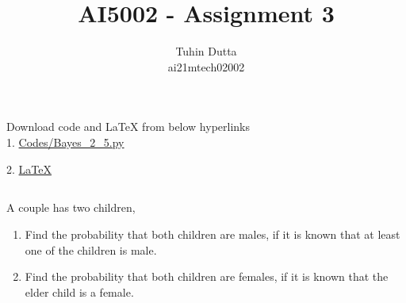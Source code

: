 \documentclass[journal,12pt,twocolumn]{IEEEtran}
\begin{document}
\providecommand{\mtx}[1]{\mathbf{#1}}
\providecommand{\fourier}{\overset{\mathcal{F}}{ \rightleftharpoons}}
\providecommand{\system}{\overset{\mathcal{H}}{ \longleftrightarrow}}
\newcommand{\solution}{\noindent \textbf{Solution: }}
\newcommand{\cosec}{\,\text{cosec}\,}
\providecommand{\dec}[2]{\ensuremath{\overset{#1}{\underset{#2}{\gtrless}}}}
\newcommand{\myvec}[1]{\ensuremath{\begin{pmatrix}#1\end{pmatrix}}}
\newcommand{\mydet}[1]{\ensuremath{\begin{vmatrix}#1\end{vmatrix}}}
\makeatletter
{}
\makeatother
\let\StandardTheFigure\thefigure
\let\vec\mathbf
\renewcommand{\thefigure}{\theproblem}
\def\putbox#1#2#3{\makebox[0in][l]{\makebox[#1][l]{}\raisebox{\baselineskip}[0in][0in]{\raisebox{#2}[0in][0in]{#3}}}}
     \def\rightbox#1{\makebox[0in][r]{#1}}
     \def\centbox#1{\makebox[0in]{#1}}
     \def\topbox#1{\raisebox{-\baselineskip}[0in][0in]{#1}}
     \def\midbox#1{\raisebox{-0.5\baselineskip}[0in][0in]{#1}}
\vspace{3cm}
\title{AI5002 - Assignment 3}
\author{Tuhin Dutta\\ ai21mtech02002}
\maketitle
\newpage
\bigskip
\renewcommand{\thefigure}{\theenumi}
\renewcommand{\thetable}{\theenumi}
\begin{mdframed}
Download code and LaTeX from below hyperlinks\\
1. \href{https://github.com/Tauhait/AI5002/blob/main/Assignment-3/Codes/Bayes_2_5.py}{Codes/Bayes\_2\_5.py}


2. \href{https://github.com/Tauhait/AI5002/tree/main/Assignment-3/LaTeX}{LaTeX}
\end{mdframed}
\subsection*{}
A couple has two children,\\
\begin{enumerate}[label=\roman*.]
\item Find the probability that both children are
males, if it is known that at least one of the
children is male.
\item Find the probability that both children are
females, if it is known that the elder child is
a female.
\end{enumerate}
\end{document}
